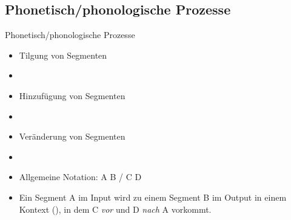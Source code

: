 %
\subsection{Phonetisch/phonologische Prozesse}
%

\begin{frame}{Phonetisch/phonologische Prozesse}

\begin{itemize}
	\item Tilgung von Segmenten
	\item[]
	\item Hinzufügung von Segmenten
	\item[]
	\item Veränderung von Segmenten
	\item[]
	\item Allgemeine Notation: A \ras B / C \underline{\quad} D
	\item[] Ein Segment A im Input wird zu einem Segment B im Output in einem Kontext (\gqq{/}), in dem C \textit{vor} und D \textit{nach} A vorkommt. 
\end{itemize}

\end{frame}



%
%

